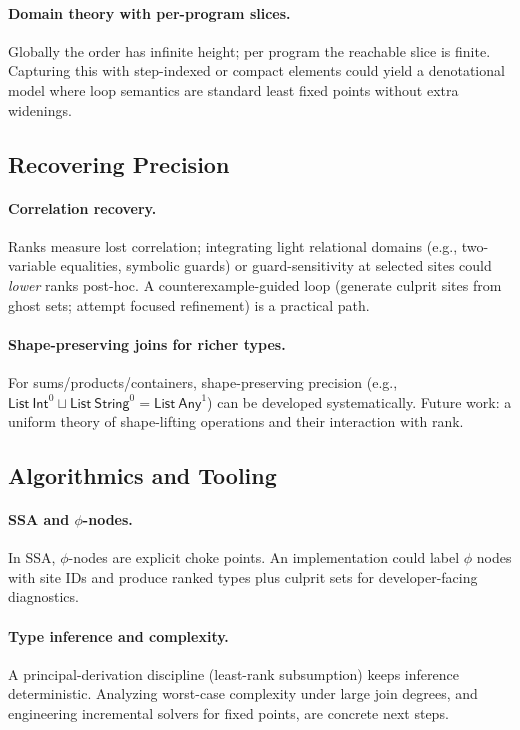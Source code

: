 \paragraph{Domain theory with per-program slices.}
Globally the order has infinite height; per program the reachable slice is finite.
Capturing this with step-indexed or compact elements could yield a denotational model where loop semantics are standard least fixed points without extra widenings.

\subsection{Recovering Precision}
\paragraph{Correlation recovery.}
Ranks measure lost correlation; integrating light relational domains (e.g., two-variable equalities, symbolic guards) or guard-sensitivity at selected sites could \emph{lower} ranks post-hoc.
A counterexample-guided loop (generate culprit sites from ghost sets; attempt focused refinement) is a practical path.

\paragraph{Shape-preserving joins for richer types.}
For sums/products/containers, shape-preserving precision (e.g., $\textsf{List}\ \textsf{Int}^0 \sqcup \textsf{List}\ \textsf{String}^0 = \textsf{List}\ \textsf{Any}^1$) can be developed systematically.
Future work: a uniform theory of shape-lifting operations and their interaction with rank.

\subsection{Algorithmics and Tooling}
\paragraph{SSA and $\phi$-nodes.}
In SSA, $\phi$-nodes are explicit choke points.
An implementation could label $\phi$ nodes with site IDs and produce ranked types plus culprit sets for developer-facing diagnostics.

\paragraph{Type inference and complexity.}
A principal-derivation discipline (least-rank subsumption) keeps inference deterministic.
Analyzing worst-case complexity under large join degrees, and engineering incremental solvers for fixed points, are concrete next steps.

